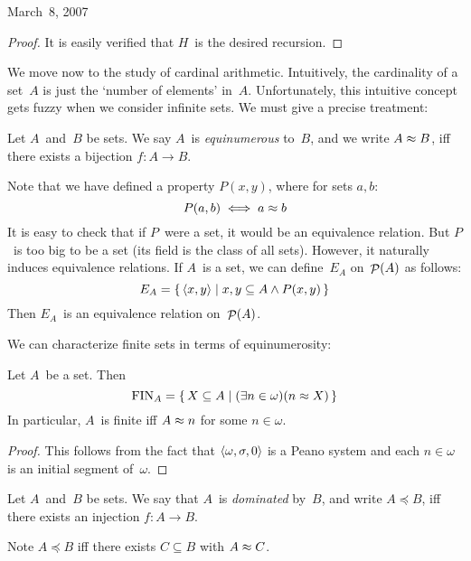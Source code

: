\begin{lecture}{March~8, 2007}
\begin{proof}
It is easily verified that \(H\)~is the desired recursion.
\end{proof}

We move now to the study of cardinal arithmetic. Intuitively, the cardinality of a set~\(A\) is just the `number of elements' in~\(A\). Unfortunately, this intuitive concept gets fuzzy when we consider infinite sets. We must give a precise treatment:
\begin{defn}
Let \(A\)~and~\(B\) be sets. We say \(A\)~is \emph{equinumerous} to~\(B\), and we write \(A\approx B\), iff there exists a bijection \(f:A\to B\).
\end{defn}
\noindent Note that we have defined a property \(P(x,y)\), where for sets \(a,b\):
\[P(a,b)\iff a\approx b\]
It is easy to check that if \(P\)~were a set, it would be an equivalence relation. But \(P\)~is too big to be a set (its field is the class of all sets). However, it naturally induces equivalence relations. If \(A\)~is a set, we can define~\(E_A\) on~\(\mathop{\mathcal{P}}(A)\) as follows:
\[E_A=\{\,\langle{x},{y}\rangle\mid x,y\subseteq A\land P(x,y)\,\}\]
Then \(E_A\)~is an equivalence relation on~\(\mathop{\mathcal{P}}(A)\).

We can characterize finite sets in terms of equinumerosity:
\begin{thm}
Let \(A\)~be a set. Then
\[\operatorname{FIN}_A=\{\,X\subseteq A\mid(\exists n\in\omega)(n\approx X)\,\}\]
In particular, \(A\)~is finite iff \(A\approx n\) for some \(n\in\omega\).
\end{thm}
\begin{proof}
This follows from the fact that \(\langle{\omega},{{\sigma},{0}}\rangle\) is a Peano system and each \(n\in\omega\) is an initial segment of~\(\omega\).
\end{proof}
\begin{defn}
Let \(A\)~and~\(B\) be sets. We say that \(A\)~is \emph{dominated} by~\(B\), and write \(A\preceq B\), iff there exists an injection \(f:A\to B\).
\end{defn}
\noindent Note \(A\preceq B\) iff there exists \(C\subseteq B\) with \(A\approx C\).


\end{lecture}
